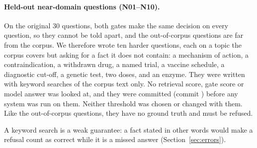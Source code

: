 \paragraph{Held-out near-domain questions (N01--N10).} On the original 30 questions, both gates make the same decision on every question, so they cannot be told apart, and the out-of-corpus questions are far from the corpus. We therefore wrote ten harder questions, each on a topic the corpus covers but asking for a fact it does not contain: a mechanism of action, a contraindication, a withdrawn drug, a named trial, a vaccine schedule, a diagnostic cut-off, a genetic test, two doses, and an enzyme. They were written with keyword searches of the corpus text only. No retrieval score, gate score or model answer was looked at, and they were committed (commit ) before any system was run on them. Neither threshold was chosen or changed with them. Like the out-of-corpus questions, they have no ground truth and must be refused.

A keyword search is a weak guarantee: a fact stated in other words would make a refusal count as correct while it is a missed answer (Section~\ref{sec:errors}).
